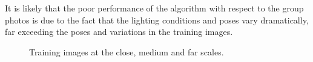 \documentclass[10pt,letterpaper]{article}
\begin{document}
It is likely that the poor performance of the algorithm with respect to the group photos is due to the fact that the lighting conditions and poses vary dramatically, far exceeding the poses and variations in the training images.
\begin{figure}[p]
\centering
{}
\caption{Training images at the close, medium and far scales.}
\label{training1}
\end{figure}
\end{document}
